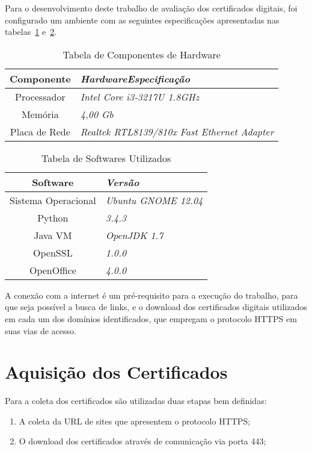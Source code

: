 		Para o desenvolvimento deste trabalho de avaliação dos certificados digitais, foi configurado um ambiente com as seguintes especificações apresentadas nas tabelas~\ref{tab:hard} e~\ref{tab:soft}.
		\begin{table}[h]
			\centering
			\caption{Tabela de Componentes de Hardware}
			\label{tab:hard}
			\begin{tabular}{c>{\em}l}
			\toprule
			\textbf{Componente} & \textbf{Hardware\/Especificação} \\ \midrule
			Processador & Intel Core i3-3217U 1.8GHz \\ 
			\rowcolor[gray]{0.9}
			Memória & 4,00 Gb \\
			Placa de Rede & Realtek RTL8139/810x Fast Ethernet Adapter \\ 
			\bottomrule
			\end{tabular}
		\end{table}
		\begin{table}[h]
			\centering
			\caption{Tabela de Softwares Utilizados}
			\label{tab:soft}
			\begin{tabular}{c>{\em}l}
			\toprule
			\textbf{Software} & \textbf{Versão} \\ \midrule
			Sistema Operacional & Ubuntu GNOME 12.04 \\ 
			\rowcolor[gray]{0.9}
			Python & 3.4.3 \\
			Java VM & OpenJDK 1.7 \\
			\rowcolor[gray]{0.9}
			OpenSSL & 1.0.0 \\
			OpenOffice & 4.0.0 \\
			\bottomrule
			\end{tabular}
		\end{table}
		A conexão com a internet é um pré-requisito para a execução do trabalho, para que seja possível a busca de links, e o download dos certificados digitais utilizados em cada um dos domínios identificados, que empregam o protocolo HTTPS em suas vias de acesso. 
		
	\section[Aquisição dos Certificados]{Aquisição dos Certificados}
	
		Para a coleta dos certificados são utilizadas duas etapas bem definidas:
		
		\begin{enumerate}
			\item A coleta da URL de sites que apresentem o protocolo HTTPS;
			\item O download dos certificados através de comunicação via porta 443;
		\end{enumerate}


